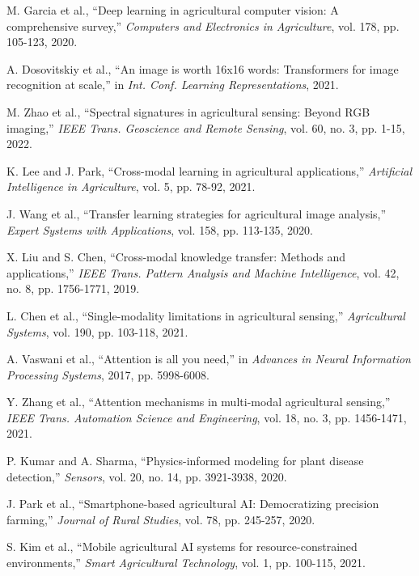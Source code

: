 \documentclass[conference]{IEEEtran}
\begin{document}
\begin{thebibliography}{00}
M. Garcia et al., ``Deep learning in agricultural computer vision: A comprehensive survey,'' \textit{Computers and Electronics in Agriculture}, vol. 178, pp. 105-123, 2020.

A. Dosovitskiy et al., ``An image is worth 16x16 words: Transformers for image recognition at scale,'' in \textit{Int. Conf. Learning Representations}, 2021.

M. Zhao et al., ``Spectral signatures in agricultural sensing: Beyond RGB imaging,'' \textit{IEEE Trans. Geoscience and Remote Sensing}, vol. 60, no. 3, pp. 1-15, 2022.

K. Lee and J. Park, ``Cross-modal learning in agricultural applications,'' \textit{Artificial Intelligence in Agriculture}, vol. 5, pp. 78-92, 2021.

J. Wang et al., ``Transfer learning strategies for agricultural image analysis,'' \textit{Expert Systems with Applications}, vol. 158, pp. 113-135, 2020.

X. Liu and S. Chen, ``Cross-modal knowledge transfer: Methods and applications,'' \textit{IEEE Trans. Pattern Analysis and Machine Intelligence}, vol. 42, no. 8, pp. 1756-1771, 2019.

L. Chen et al., ``Single-modality limitations in agricultural sensing,'' \textit{Agricultural Systems}, vol. 190, pp. 103-118, 2021.

A. Vaswani et al., ``Attention is all you need,'' in \textit{Advances in Neural Information Processing Systems}, 2017, pp. 5998-6008.

Y. Zhang et al., ``Attention mechanisms in multi-modal agricultural sensing,'' \textit{IEEE Trans. Automation Science and Engineering}, vol. 18, no. 3, pp. 1456-1471, 2021.

P. Kumar and A. Sharma, ``Physics-informed modeling for plant disease detection,'' \textit{Sensors}, vol. 20, no. 14, pp. 3921-3938, 2020.

J. Park et al., ``Smartphone-based agricultural AI: Democratizing precision farming,'' \textit{Journal of Rural Studies}, vol. 78, pp. 245-257, 2020.

S. Kim et al., ``Mobile agricultural AI systems for resource-constrained environments,'' \textit{Smart Agricultural Technology}, vol. 1, pp. 100-115, 2021.


\end{thebibliography}
\end{document}
